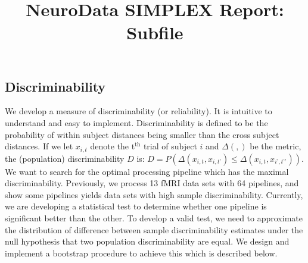 \documentclass[simplex.tex]{subfiles}
\title{NeuroData SIMPLEX Report: Subfile}
\begin{document}

\subsection{Discriminability}

We develop a measure of discriminability (or reliability).  It
is intuitive to understand and easy to implement.
Discriminability is defined to be the probability of within
subject distances being smaller than the cross subject
distances. If we let $x_{i,t}$ denote the t$^{\text{th}}$ trial of subject 
$i$ and $\Delta(,)$ be the metric, the (population) discriminability $D$
is: $D= P (\Delta(x_{i,t} , x_{i,t’}) \leq  \Delta(x_{i,t} , x_{i’,t’’}))$.
We want to
search for the optimal processing pipeline which has the
maximal discriminability. Previously, we process 13 fMRI data
sets with 64 pipelines, and show some pipelines yields data
sets with high sample discriminability. Currently, we are
developing a statistical test to determine whether one
pipeline is significant better than the other. To develop a
valid test, we need to approximate the distribution of
difference between sample discriminability estimates under the
null hypothesis that two population discriminability are
equal. We design and implement a bootstrap procedure to
achieve this  which is described below.
\end{document}
